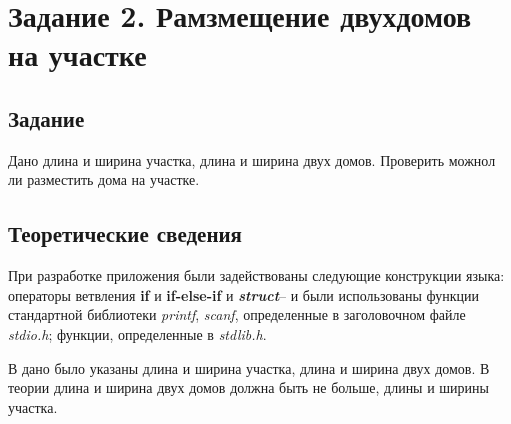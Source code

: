\documentclass[12pt,a4paper]{report}
\begin{document}
\section{Задание 2. Рамзмещение двухдомов на участке}

\subsection{Задание}
\hspace{\parindent}
Дано длина и ширина участка, длина и ширина двух домов. Проверить можнол ли разместить дома на участке.
\subsection{Теоретические сведения}
\hspace{\parindent}
При разработке приложения были задействованы следующие конструкции языка: операторы ветвления \textbf{if} и \textbf{if-else-if} и \textbf{\textit{struct}}-- и были использованы функции стандартной библиотеки \textit{printf}, \textit{scanf}, определенные в заголовочном файле \textit{stdio.h}; функции, определенные в \textit{stdlib.h}.

\hspace{\parindent}
В дано было указаны длина и ширина участка, длина и ширина двух домов. В теории длина и ширина двух домов должна быть не больше, длины и ширины участка.
\end{document}

